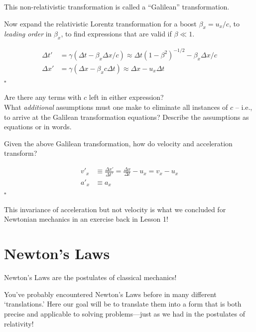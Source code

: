 \documentclass[11pt, letterpaper, openany]{book}
\newenvironment{exercise}[1][Exercise]{%
  \tcolorbox[blanker, breakable, left=1em,
    before skip=1em, after skip=1em,
    borderline west={3pt}{0pt}{PhysNavy},
    colback=PhysCream,
    before upper={\textcolor{PhysNavy}{\sffamily\bfseries #1:}\space}
  ]%
}{%
  \endtcolorbox%
}
\newenvironment{solution}[1][Solution]{%
  \tcolorbox[blanker, breakable, left=1em,
    before skip=1em, after skip=1em,
    borderline west={2pt}{0pt}{PhysTeal},
    colback=PhysCream,
    before upper={\textcolor{PhysTeal}{\sffamily\bfseries #1.}\space}
  ]%
}{%
  \hfill\textcolor{PhysTeal}{\ensuremath{\square}}\endtcolorbox%
}
\begin{document}
This non-relativistic transformation is called a ``Galilean'' transformation.

\begin{exercise}[Exercise 3]
Now expand the relativistic Lorentz transformation for a boost $\beta_x = u_x/c$, to \textit{leading order} in $\beta_x$, to find expressions that are valid if $\beta \ll 1$.
\end{exercise}
\begin{solution}
\begin{align*}
    \Delta t' &= \gamma(\Delta t - \beta_x \Delta x/c) \approx \Delta t (1 - \beta^2)^{-1/2} - \beta_x \Delta x / c \\
    \Delta x' &= \gamma(\Delta x - \beta_x c \Delta t) \approx \Delta x - u_x \Delta t
\end{align*}
\end{solution}

Are there any terms with $c$ left in either expression? \\
What \textit{additional} assumptions must one make to eliminate all instances of $c$ -- i.e., to arrive at the Galilean transformation equations? Describe the assumptions as equations or in words.

\begin{exercise}[Exercise 4]
Given the above Galilean transformation, how do velocity and acceleration transform?
\end{exercise}
\begin{solution}
\begin{align*}
    v'_x &\equiv \frac{\Delta x'}{\Delta t'} = \frac{\Delta x}{\Delta t} - u_x = v_x - u_x \\
    a'_x &\equiv a_x
\end{align*}
\end{solution}

This invariance of acceleration but not velocity is what we concluded for Newtonian mechanics in an exercise back in Lesson 1!

\section{Newton's Laws}

Newton's Laws are the postulates of classical mechanics!

You've probably encountered Newton's Laws before in many different `translations.' Here our goal will be to translate them into a form that is both precise and applicable to solving problems---just as we had in the postulates of relativity!
\end{document}
